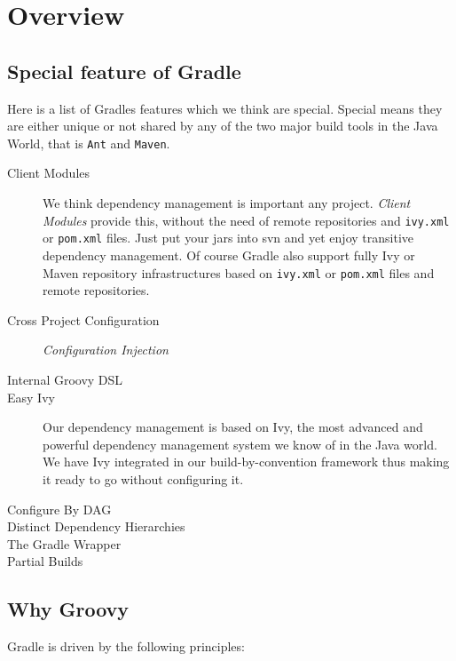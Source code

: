 \chapter{Overview} %
\label{cha:overview}

\section{Special feature of Gradle} %
\label{sec:special_feature_of_gradle}
Here is a list of Gradles features which we think are special. Special means they are either unique or not shared by any of the two major build tools in the Java World, that is \texttt{Ant} and \texttt{Maven}.
\begin{description}
	\item[Client Modules] We think dependency management is important any project. \emph{Client Modules} provide this, without the need of remote repositories and \texttt{ivy.xml} or \texttt{pom.xml} files. Just put your jars into svn and yet enjoy transitive dependency management. Of course Gradle also support fully Ivy or Maven repository infrastructures based on \texttt{ivy.xml} or \texttt{pom.xml} files and remote repositories.
	\item[Cross Project Configuration] \emph{Configuration Injection}
	\item[Internal Groovy DSL] 
	\item[Easy Ivy] Our dependency management is based on Ivy, the most advanced and powerful dependency management system we know of in the Java world. We have Ivy integrated in our build-by-convention framework thus making it ready to go without configuring it.
	\item[Configure By DAG] 
	\item[Distinct Dependency Hierarchies]
    \item[The Gradle Wrapper]  
    \item[Partial Builds]  
\end{description}

\section{Why Groovy} %
\label{sec:why_groovy}


Gradle is driven by the following principles:

